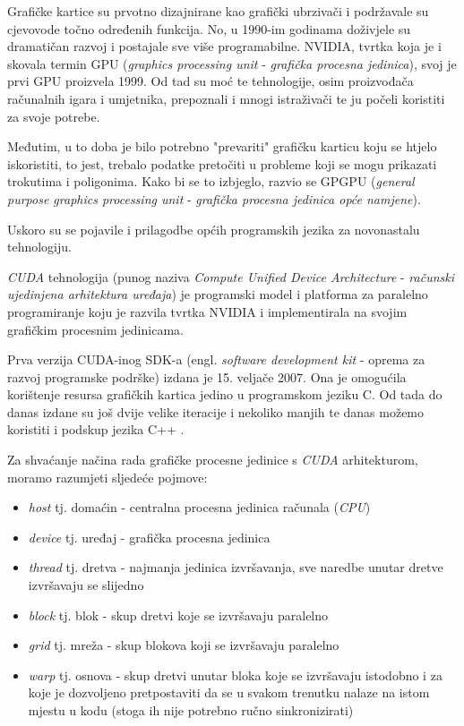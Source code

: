 \documentclass[times, utf8, zavrsni, numeric]{fer}
\begin{document}
Grafičke kartice su prvotno dizajnirane kao grafički ubrzivači i podržavale su cjevovode točno određenih funkcija. No, u 1990-im godinama doživjele su dramatičan razvoj i postajale sve više programabilne. NVIDIA, tvrtka koja je i skovala termin GPU (\emph{graphics processing unit} - \emph{grafička procesna jedinica}), svoj je prvi GPU proizvela 1999. Od tad su moć te tehnologije, osim proizvođača računalnih igara i umjetnika, prepoznali i mnogi istraživači te ju počeli koristiti za svoje potrebe.

Međutim, u to doba je bilo potrebno "prevariti" grafičku karticu koju se htjelo iskoristiti, to jest, trebalo podatke pretočiti u probleme koji se mogu prikazati trokutima i poligonima. Kako bi se to izbjeglo, razvio se GPGPU (\textit{general purpose graphics processing unit} - \textit{grafička procesna jedinica opće namjene}).

Uskoro su se pojavile i prilagodbe općih programskih jezika za novonastalu tehnologiju.

\textit{CUDA} tehnologija (punog naziva \textit{Compute Unified Device Architecture} - \textit{računski ujedinjena arhitektura uređaja}) je programski model i platforma za paralelno programiranje koju je razvila tvrtka NVIDIA i implementirala na svojim grafičkim procesnim jedinicama.\cite{cuda}

Prva verzija CUDA-inog SDK-a (engl. \textit{software development kit} - oprema za razvoj programske podrške) izdana je 15. veljače 2007. Ona je omogućila korištenje resursa grafičkih kartica jedino u programskom jeziku C. Od tada do danas izdane su još dvije velike iteracije i nekoliko manjih te danas možemo koristiti i podskup jezika C++ \cite{rahlezavrsni}.

Za shvaćanje načina rada grafičke procesne jedinice s \emph{CUDA} arhitekturom, moramo razumjeti sljedeće pojmove\cite{rahlezavrsni}:
\begin{itemize}
\item \emph{host} tj. domaćin - centralna procesna jedinica računala (\emph{CPU})
\item \emph{device} tj. uređaj - grafička procesna jedinica
\item \emph{thread} tj. dretva - najmanja jedinica izvršavanja, sve naredbe unutar dretve izvršavaju se slijedno
\item \emph{block} tj. blok - skup dretvi koje se izvršavaju paralelno
\item \emph{grid} tj. mreža - skup blokova koji se izvršavaju paralelno
\item \emph{warp} tj. osnova - skup dretvi unutar bloka koje se izvršavaju istodobno i za koje je dozvoljeno pretpostaviti da se u svakom trenutku nalaze na istom mjestu u kodu (stoga ih nije potrebno ručno sinkronizirati)
\end{itemize}
\end{document}
